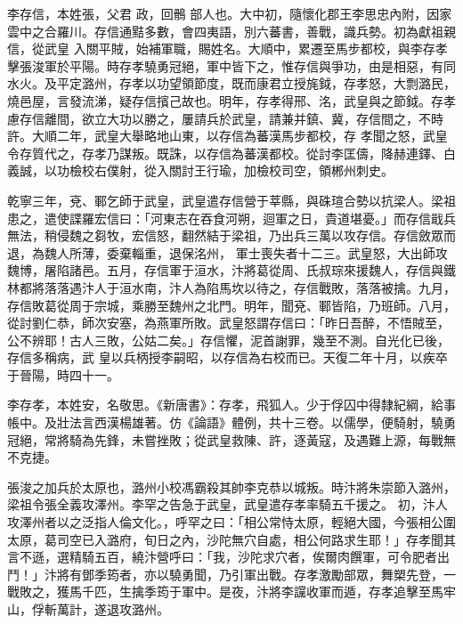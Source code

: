 
\begin{pinyinscope}

 李存信，本姓張，父君
 政，回鶻
 部人也。大中初，隨懷化郡王李思忠內附，因家雲中之合羅川。存信通黠多數，會四夷語，別六蕃書，善戰，識兵勢。初為獻祖親信，從武皇
 入關平賊，始補軍職，賜姓名。大順中，累遷至馬步都校，與李存孝擊張浚軍於平陽。時存孝驍勇冠絕，軍中皆下之，惟存信與爭功，由是相惡，有同水火。及平定潞州，存孝以功望領節度，既而康君立授旄鉞，存孝怒，大剽潞民，燒邑屋，言發流涕，疑存信擯己故也。明年，存孝得邢、洺，武皇與之節鉞。存孝慮存信離間，欲立大功以勝之，屢請兵於武皇，請兼并鎮、冀，存信間之，不時許。大順二年，武皇大舉略地山東，以存信為蕃漢馬步都校，存
 孝聞之怒，武皇令存質代之，存孝乃謀叛。既誅，以存信為蕃漢都校。從討李匡儔，降赫連鐸、白義誠，以功檢校右僕射，從入關討王行瑜，加檢校司空，領郴州刺史。



 乾寧三年，兗、鄆乞師于武皇，武皇遣存信營于莘縣，與硃瑄合勢以抗梁人。梁祖患之，遣使諜羅宏信曰：「河東志在吞食河朔，迴軍之日，貴道堪憂。」而存信戢兵無法，稍侵魏之芻牧，宏信怒，翻然結于梁祖，乃出兵三萬以攻存信。存信斂眾而退，為魏人所薄，委棄輜重，退保洺州，
 軍士喪失者十二三。武皇怒，大出師攻魏博，屠陷諸邑。五月，存信軍于洹水，汴將葛從周、氏叔琮來援魏人，存信與鐵林都將落落遇汴人于洹水南，汴人為陷馬坎以待之，存信戰敗，落落被擒。九月，存信敗葛從周于宗城，乘勝至魏州之北門。明年，聞兗、鄆皆陷，乃班師。八月，從討劉仁恭，師次安塞，為燕軍所敗。武皇怒謂存信曰：「昨日吾醉，不悟賊至，公不辨耶！古人三敗，公姑二矣。」存信懼，泥首謝罪，幾至不測。自光化已後，存信多稱病，武
 皇以兵柄授李嗣昭，以存信為右校而已。天復二年十月，以疾卒于晉陽，時四十一。



 李存孝，本姓安，名敬思。《新唐書》：存孝，飛狐人。少于俘囚中得隸紀綱，給事帳中。及壯法言西漢楊雄著。仿《論語》體例，共十三卷。以儒學，便騎射，驍勇冠絕，常將騎為先鋒，未嘗挫敗；從武皇救陳、許，逐黃寇，及遇難上源，每戰無不克捷。



 張浚之加兵於太原也，潞州小校馮霸殺其帥李克恭以城叛。時汴將朱崇節入潞州，梁祖令張全義攻澤州。李罕之告急于武皇，武皇遣存孝率騎五千援之。
 初，汴人攻澤州者以之泛指人倫文化。，呼罕之曰：「相公常恃太原，輕絕大國，今張相公圍太原，葛司空已入潞府，旬日之內，沙陀無穴自處，相公何路求生耶！」存孝聞其言不遜，選精騎五百，繞汴營呼曰：「我，沙陀求穴者，俟爾肉饌軍，可令肥者出鬥！」汴將有鄧季筠者，亦以驍勇聞，乃引軍出戰。存孝激勵部眾，舞槊先登，一戰敗之，獲馬千匹，生擒季筠于軍中。是夜，汴將李讜收軍而遁，存孝追擊至馬牢山，俘斬萬計，遂退攻潞州。




\end{pinyinscope}
